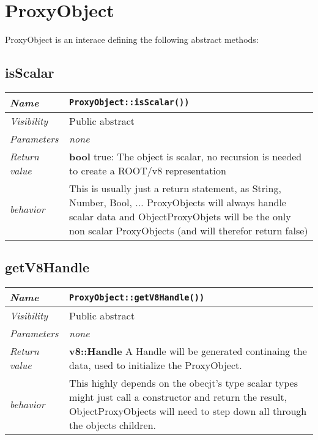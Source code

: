 \chapter{ProxyObject}
ProxyObject is an interace defining the following abstract methods:
\section{isScalar}
\begin{longtable}{p{3cm} @{\hskip 1cm} p{12cm}}
  \hline
  \textit{Name} & \texttt{ProxyObject::isScalar())} \\
  \hline
  \textit{Visibility} & Public abstract \\
  \hline
  \textit{Parameters} & \textit{none} \\
  \hline
  \textit{Return value} & \textbf{bool} true: The object is scalar, no recursion is needed to create a ROOT/v8 representation \\
  \hline
  \textit{behavior} & This is usually just a return statement, as String, Number, Bool, ... ProxyObjects will always handle scalar data and ObjectProxyObjets will be the only non scalar ProxyObjects (and will therefor return false) \\
  \hline
\end{longtable}
\section{getV8Handle}
\begin{longtable}{p{3cm} @{\hskip 1cm} p{12cm}}
  \hline
  \textit{Name} & \texttt{ProxyObject::getV8Handle())} \\
  \hline
  \textit{Visibility} & Public abstract \\
  \hline
  \textit{Parameters} & \textit{none} \\
  \hline
  \textit{Return value} & \textbf{v8::Handle} A Handle will be generated continaing the data, used to initialize the ProxyObject. \\
  \hline
  \textit{behavior} & This highly depends on the obecjt's type scalar types might just call a constructor and return the result, ObjectProxyObjects will need to step down all through the objects children. \\
  \hline
\end{longtable}
